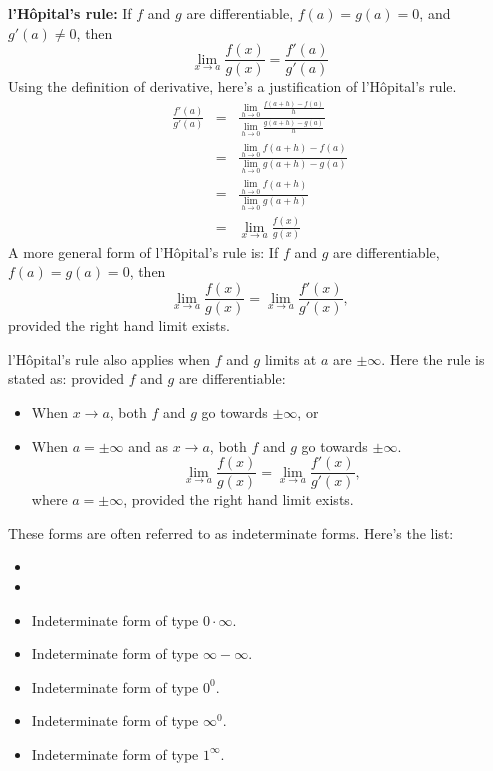 \documentclass[12pt,addpoints, answers, fleqn]{exam}
\begin{document}
\textbf{l'H\^{o}pital's rule:} If $f$ and $g$ are differentiable, $f\left(a\right) = g\left(a\right) = 0$, and $g'\left(a\right) \neq 0$, then
\[
\mathop {\lim }\limits_{ x \to a} \frac{f\left(x\right)}{g\left(x\right)} =
\frac{f'\left(a\right)}{g'\left(a\right)}
\]
Using the definition of derivative, here's a justification of l'H\^{o}pital's rule.
\begin{eqnarray*}
\frac{f'\left(a\right)}{g'\left(a\right)} &=&
\frac{\mathop {\lim }\limits_{ h \to 0} \frac{ f\left( a+h \right) - f\left( a \right) }{h}}{\mathop {\lim }\limits_{ h \to 0} \frac{ g\left( a+h \right) - g\left( a \right) }{h}}\\
&=&
\frac{\mathop {\lim }\limits_{ h \to 0} f\left( a+h \right) - f\left( a \right)}{\mathop {\lim }\limits_{ h \to 0}  g\left( a+h \right) - g\left( a \right) }\\
&=&
\frac{\mathop {\lim }\limits_{ h \to 0} f\left( a+h \right)}{\mathop {\lim }\limits_{ h \to 0}  g\left( a+h \right) }\\
&=&
\mathop {\lim }\limits_{ x \to a} \frac{f\left( x \right)}{g\left( x\right) }
\end{eqnarray*}
A more general form of l'H\^{o}pital's rule is: If $f$ and $g$ are differentiable, $f\left(a\right) = g\left(a\right) = 0$, then
\[
\mathop {\lim }\limits_{ x \to a} \frac{f\left(x\right)}{g\left(x\right)} =
\mathop {\lim }\limits_{ x \to a} \frac{f'\left(x\right)}{g'\left(x\right)},
\]
provided the right hand limit exists.



l'H\^{o}pital's rule  also applies when $f$ and $g$ limits at $a$ are $\pm \infty$. Here the rule is stated as: provided $f$ and $g$ are differentiable:
\begin{itemize}
\item When $x \to a$, both $f$ and $g$ go towards $\pm \infty$, or
\item When $a = \pm \infty$ and as  $x \to a$, both $f$ and $g$ go towards $\pm \infty$.
\[
\mathop {\lim }\limits_{ x \to a} \frac{f\left(x\right)}{g\left(x\right)} =
\mathop {\lim }\limits_{ x \to a} \frac{f'\left(x\right)}{g'\left(x\right)},
\]
where $a=\pm \infty$, provided the right hand limit exists.
\end{itemize}

These forms are often referred to as indeterminate forms. Here's the list:
\begin{itemize}
\item {}
\item {}
\item Indeterminate form of type $0 \cdot \infty$.
\item Indeterminate form of type $\infty - \infty$.
\item Indeterminate form of type $0^0$.
\item Indeterminate form of type $\infty^0$.
\item Indeterminate form of type $1^\infty$.
\end{itemize}
\end{document}
